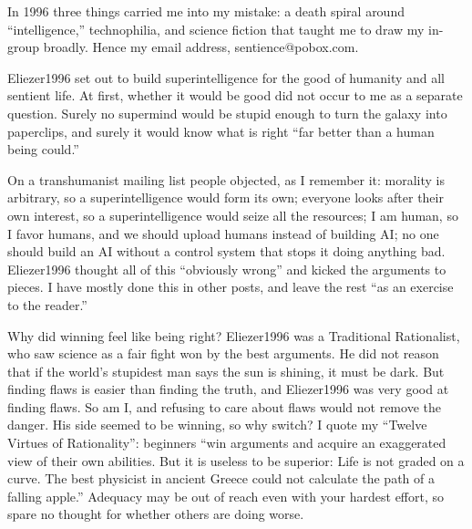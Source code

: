 
In 1996 three things carried me into my mistake: a death spiral around ``intelligence,'' technophilia, and science fiction that taught me to draw my in-group broadly. Hence my email address, sentience@pobox.com. 

Eliezer1996 set out to build superintelligence for the good of humanity and all sentient life. At first, whether it would be good did not occur to me as a separate question. Surely no supermind would be stupid enough to turn the galaxy into paperclips, and surely it would know what is right ``far better than a human being could.'' 

On a transhumanist mailing list people objected, as I remember it: morality is arbitrary, so a superintelligence would form its own; everyone looks after their own interest, so a superintelligence would seize all the resources; I am human, so I favor humans, and we should upload humans instead of building AI; no one should build an AI without a control system that stops it doing anything bad. Eliezer1996 thought all of this ``obviously wrong'' and kicked the arguments to pieces. I have mostly done this in other posts, and leave the rest ``as an exercise to the reader.'' 

Why did winning feel like being right? Eliezer1996 was a Traditional Rationalist, who saw science as a fair fight won by the best arguments. He did not reason that if the world's stupidest man says the sun is shining, it must be dark. But finding flaws is easier than finding the truth, and Eliezer1996 was very good at finding flaws. So am I, and refusing to care about flaws would not remove the danger. His side seemed to be winning, so why switch? I quote my ``Twelve Virtues of Rationality'': beginners ``win arguments and acquire an exaggerated view of their own abilities. But it is useless to be superior: Life is not graded on a curve. The best physicist in ancient Greece could not calculate the path of a falling apple.'' Adequacy may be out of reach even with your hardest effort, so spare no thought for whether others are doing worse.


